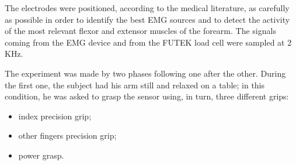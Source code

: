 The electrodes were positioned, according to the medical literature, as carefully as possible in order to identify the best EMG sources and to detect the activity of the most relevant flexor and extensor muscles of the forearm. The signals coming from the EMG device and from the FUTEK load cell were sampled at 2 KHz.

The experiment was made by two phases following one after the other. During the first one, the subject had his arm still and relaxed on a table; in this condition, he was asked to grasp the sensor using, in turn, three different grips:
\begin{itemize}
	\item index precision grip;
	\item other fingers precision grip;
	\item power grasp.
\end{itemize}

